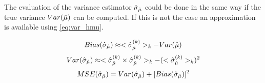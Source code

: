 The evaluation of the variance estimator $\hat\sigma_{\hat\mu}$ could be done in the same way if the true variance $Var(\hat\mu)$ can be computed.
If this is not the case an approximation is available using \autoref{eq:var_hmu}.

\begin{equation}
  Bias(\hat\sigma_{\hat\mu}) \approx <\hat\sigma_{\hat\mu}^{(k)}>_k - Var(\hat\mu)
\end{equation}
\begin{equation}
  Var(\hat\sigma_{\hat\mu}) \approx <\hat\sigma_{\hat\mu}^{(k)} \times \hat\sigma_{\hat\mu}^{(k)}>_k - (<\hat\sigma_{\hat\mu}^{(k)}>_k)^2
\end{equation}
\begin{equation}
  MSE(\hat\sigma_{\hat\mu}) = Var(\hat\sigma_{\hat\mu}) + [Bias(\hat\sigma_{\hat\mu})]^2
\end{equation}


